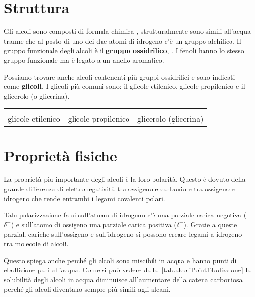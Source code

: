 \section{Struttura}
Gli alcoli sono composti di formula chimica , strutturalmente sono simili all'acqua tranne che al posto di uno dei due atomi di idrogeno c'è un gruppo alchilico. Il gruppo funzionale degli alcoli è il \textbf{gruppo ossidrilico}, . I fenoli hanno lo stesso gruppo funzionale ma è legato a un anello aromatico.

Possiamo trovare anche alcoli contenenti più gruppi ossidrilici e sono indicati come \textbf{glicoli}. I glicoli più comuni sono: il glicole etilenico, glicole propilenico e il glicerolo (o glicerina).

\begin{table}[H]
	\centering
	\renewcommand{\arraystretch}{2}
	\begin{tabularx}{\textwidth}{Y Y Y}
		 &  &  \\
		glicole etilenico                        & glicole propilenico                                & glicerolo (glicerina)                                      \\
	\end{tabularx}
\end{table}


\section{Proprietà fisiche}
La proprietà più importante degli alcoli è la loro polarità. Questo è dovuto della grande differenza di elettronegatività tra ossigeno e carbonio e tra ossigeno e idrogeno che rende entrambi i legami covalenti polari.

Tale polarizzazione fa si sull'atomo di idrogeno c'è una parziale carica negativa (\(\delta^-\)) e sull'atomo di ossigeno una parziale carica positiva (\(\delta^+\)). Grazie a queste parziali cariche sull'ossigeno e sull'idrogeno si possono creare legami a idrogeno tra molecole di alcoli.

Questo spiega anche perché gli alcoli sono miscibili in acqua e hanno punti di ebollizione pari all'acqua. Come si può vedere dalla~\autoref{tab:alcoliPointEbolizzione} la solubilità degli alcoli in acqua diminuisce all'aumentare della catena carboniosa perché gli alcoli diventano sempre più simili agli alcani.


